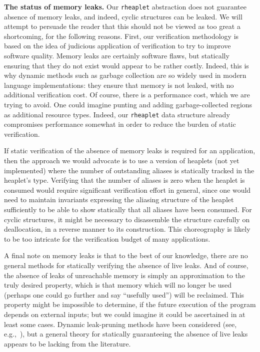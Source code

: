 \documentclass[9pt,natbib]{sigplanconf}
\begin{document}
\textbf{The status of memory leaks.} Our \texttt{rheaplet} abstraction
does not guarantee absence of memory leaks, and indeed, cyclic
structures can be leaked.  We will attempt to persuade the reader that
this should not be viewed as too great a shortcoming, for the
following reasons.  First, our verification methodology is based on
the idea of judicious application of verification to try to improve
software quality.  Memory leaks are certainly software flaws, but
statically ensuring that they do not exist would appear to be rather
costly.  Indeed, this is why dynamic methods such as garbage
collection are so widely used in modern language implementations: they
ensure that memory is not leaked, with no additional verification
cost.  Of course, there is a performance cost, which we are trying to
avoid.  One could imagine punting and adding garbage-collected regions
as additional resource types.  Indeed, our \texttt{rheaplet} data
structure already compromises performance somewhat in order to reduce
the burden of static verification.

If static verification of the absence of memory leaks is required for
an application, then the approach we would advocate is to use a
version of heaplets (not yet implemented) where the number of
outstanding aliases is statically tracked in the heaplet's type.
Verifying that the number of aliases is zero when the heaplet is
consumed would require significant verification effort in general,
since one would need to maintain invariants expressing the aliasing
structure of the heaplet sufficiently to be able to show statically
that all aliases have been consumed.  For cyclic structures, it might
be necessary to disassemble the structure carefully on deallocation,
in a reverse manner to its construction.  This choreography is
likely to be too intricate for the verification budget of many
applications.

A final note on memory leaks is that to the best of our knowledge,
there are no general methods for statically verifying the absence of
live leaks.  And of course, the absence of leaks of unreachable memory
is simply an approximation to the truly desired property, which is
that memory which will no longer be used (perhaps one could go further
and say ``usefully used'') will be reclaimed.  This property might be
impossible to determine, if the future execution of the program
depends on external inputs; but we could imagine it could be
ascertained in at least some cases.  Dynamic leak-pruning methods have
been considered (see, e.g.,~\cite{bond+09}), but a general theory for
statically guaranteeing the absence of live leaks appears to be
lacking from the literature.
\end{document}
